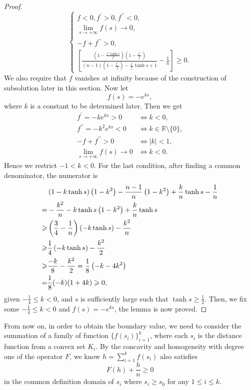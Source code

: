 \documentclass[reqno]{amsart}
\theoremstyle{remark}
\theoremstyle{definition}
\numberwithin{equation}{section}
\begin{document}
\begin{proof}
\[\begin{cases}
    f<0, f^{\prime}>0, f^{\prime \prime}<0, \\
    \lim_{s \to +\infty} f(s) \to 0,\\
    -f + f^{\prime \prime} > 0, \\
    \left[ \frac{\left( 1-\frac{f^{\prime} \tanh s}{f} \right) \left( 1-\frac{f^{\prime \prime}}{f} \right)}{\left( n-1 \right)\left( 1-\frac{f^{\prime \prime}}{f} \right) -\frac{f^{\prime}}{f} \tanh s +1} - \frac{1}{n} \right] \geqslant 0.
\end{cases}
\]
We also require that $f$ vanishes at infinity because of the construction of subsolution later in this section. Now let 
\[
f(s) = -e^{ks},
\]
where $k$ is a constant to be determined later.
Then we get
\begin{align*}
    f^{\prime} = -ke^{ks} > 0 &\Longleftrightarrow k < 0, \\
    f^{\prime \prime} = -k^{2}e^{ks} < 0 &\Longleftrightarrow k \in \mathbb{R}\setminus\{0\}, \\
    -f + f^{\prime \prime} > 0 &\Longleftrightarrow |k| < 1, \\
    \lim_{s \to +\infty} f(s) \to 0 &\Longleftrightarrow k<0. 
\end{align*}
Hence we restrict $-1 < k < 0$. For the last condition, after finding a common denominator, the numerator is 
\begin{align}\label{numerator}
    &\left( 1-k\tanh s \right) \left( 1-k^{2} \right) - \frac{n-1}{n} \left( 1-k^{2} \right) + \frac{k}{n} \tanh s - \frac{1}{n} \notag \\
    =&-\frac{k^2}{n} - k\tanh s \left( 1-k^{2} \right) + \frac{k}{n} \tanh s \notag \\
    \geqslant&\left( \frac{3}{4} - \frac{1}{n} \right) \left( -k\tanh s \right) -\frac{k^2}{n} \notag \\
    \geqslant&\frac{1}{4} \left( -k\tanh s \right) -\frac{k^2}{2} \notag \\
    \geqslant&\frac{-k}{8} -\frac{k^2}{2} = \frac{1}{8}\left( -k - 4k^2 \right) \notag \\
    =& \frac{1}{8}(-k)(1+4k ) \geqslant 0, 
\end{align}
given $-\frac{1}{4} \leqslant k <0$, and $s$ is sufficiently large such that $\tanh s \geqslant \frac{1}{2}$. Then, we fix some $-\frac{1}{4} \leqslant k <0$ and $f(s) = -e^{ks}$, the lemma is now proved.
\end{proof}

From now on, in order to obtain the boundary value, we need to consider the summation of a family of function $\{f(s_i)\}_{i=1}^k$, where each $s_i$ is the distance function from a convex set $K_i$. By the concavity and homogeneity with degree one of the operator $F$, we know $h = \sum_{i=1}^{k} f(s_i)$ also satisfies
\[
F(h) + \frac{h}{n} \geqslant 0
\]
in the common definition domain of $s_i$ where $s_i \geqslant s_0$ for any $1 \leqslant i \leqslant k$.
\end{document}
